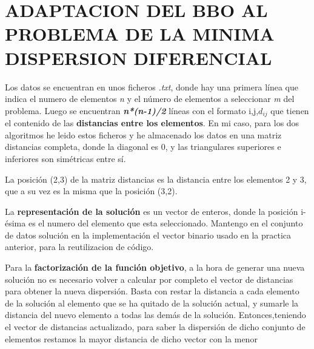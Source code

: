 \documentclass{article}
\begin{document}
\section{\large ADAPTACION DEL BBO AL PROBLEMA DE LA MINIMA DISPERSION DIFERENCIAL}

\vspace{5mm}

Los datos se encuentran en unos ficheros \emph{.txt}, donde hay una primera línea 
que indica el numero de elementos \emph{n} y el número de elementos a seleccionar
\emph{m} del problema.
\newline Luego se encuentran \textbf{\emph{n*(n-1)/2}} líneas con el formato i,j,$d_{ij}$ que
tienen el contenido de las \textbf{distancias entre los elementos}.
\newline En mi caso, para los dos algoritmos he leido estos ficheros
y he almacenado los datos en una matriz distancias completa, donde la diagonal es 0,
y las triangulares superiores e inferiores son simétricas entre sí.

\vspace{5mm}

La posición (2,3) de la matriz distancias es la distancia entre los elementos 2 y 3,
que a su vez es la misma que la posición (3,2).

\vspace{5mm}

La \textbf{representación de la solución} es un vector de enteros, donde la posición i-ésima
es el numero del elemento que esta seleccionado.
Mantengo en el conjunto de datos solución en la implementación el vector binario usado en la 
practica anterior, para la reutilizacion de código.

\vspace{5mm}

Para la \textbf{factorización de la función objetivo}, a la hora de generar una nueva solución no
es necesario volver a calcular por completo el vector de distancias para obtener la nueva
dispersión. Basta con restar la distancia a cada elemento de la solución al elemento que 
se ha quitado de la solución actual, y sumarle la distancia del nuevo elemento a todas las demás 
de la solución.
\newline Entonces,teniendo el vector de distancias actualizado, para saber la dispersión de dicho conjunto 
de elementos restamos la mayor distancia de dicho vector con la menor

\vspace{5mm}
\end{document}
